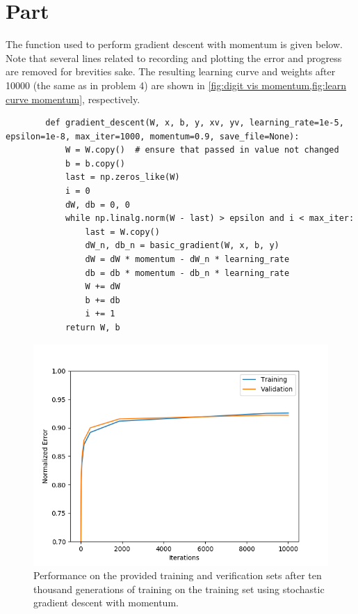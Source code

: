 \documentclass{article}
\newcommand{\enterproblemHeader}[1]{
}
\newcommand{\exitproblemHeader}[1]{
}
\newcounter{problem} %
\newcommand{\problemName}{}
\newenvironment{problem}[1][Part \theproblem]{ %
	\stepcounter{problem} %
	\renewcommand{\problemName}{#1} %
	\section{\problemName} %
	\enterproblemHeader{\problemName} %
}{
	\exitproblemHeader{\problemName} %
}
\begin{document}
\begin{problem}
	The function used to perform gradient descent with momentum is given below. Note that several lines related to recording and plotting the error and progress are removed for brevities sake. The resulting learning curve and weights after \num{10000} (the same as in problem 4) are shown in \cref{fig:digit vis momentum,fig:learn curve momentum}, respectively.
	
	\begin{verbatim}
		def gradient_descent(W, x, b, y, xv, yv, learning_rate=1e-5, epsilon=1e-8, max_iter=1000, momentum=0.9, save_file=None):
			W = W.copy()  # ensure that passed in value not changed
			b = b.copy()
			last = np.zeros_like(W)
			i = 0
			dW, db = 0, 0
			while np.linalg.norm(W - last) > epsilon and i < max_iter:
				last = W.copy()
				dW_n, db_n = basic_gradient(W, x, b, y)
				dW = dW * momentum - dW_n * learning_rate
				db = db * momentum - db_n * learning_rate
				W += dW
				b += db
				i += 1
			return W, b
	\end{verbatim}
	
	\begin{figure}
		\includegraphics[width=\linewidth]{learning_rate_momentum}
		\caption{Performance on the provided training and verification sets after ten thousand generations of training on the training set using stochastic gradient descent with momentum.}
		\label{fig:learn curve momentum}
	\end{figure}
	

\end{problem}
\end{document}
